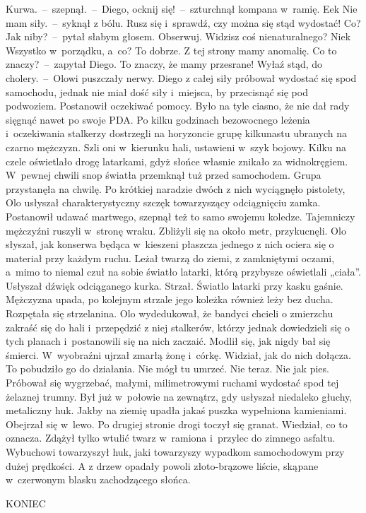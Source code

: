 \documentclass[../MAIN.tex]{subfiles}
\begin{document}
\sx Kurwa.~--~szepnął.~--~Diego, ocknij się!~--~szturchnął kompana w~ramię.
\xx Ee\3k Nie mam siły.~--~syknął z bólu.
\xx Rusz się i~sprawdź, czy można się stąd wydostać!
\xx Co? Jak niby?~--~pytał słabym głosem.
\xx Obserwuj. Widzisz coś nienaturalnego?
\xx Nie\3k Wszystko w~porządku, a~co?
\xx To dobrze. Z tej strony mamy anomalię.
\xx Co to znaczy?~--~zapytał Diego.
\xx To znaczy, że mamy przesrane! Wyłaź stąd, do cholery.~--~Olowi puszczały nerwy.
\qm
Diego z całej siły próbował wydostać się spod samochodu, jednak nie miał dość siły i~miejsca, by przecisnąć się pod podwoziem. Postanowił oczekiwać pomocy. Było na tyle ciasno, że nie dał rady sięgnąć nawet po swoje PDA.
\pp
Po kilku godzinach bezowocnego leżenia i~oczekiwania stalkerzy dostrzegli na horyzoncie grupę kilkunastu ubranych na czarno mężczyzn. Szli oni w~kierunku hali, ustawieni w~szyk bojowy. Kilku na czele oświetlało drogę latarkami, gdyż słońce własnie znikało za widnokręgiem. W~pewnej chwili snop światła przemknął tuż przed samochodem. Grupa przystanęła na chwilę. Po krótkiej naradzie dwóch z nich wyciągnęło pistolety, Olo usłyszał charakterystyczny szczęk towarzyszący odciągnięciu zamka. Postanowił udawać martwego, szepnął też to samo swojemu koledze.
\pp
Tajemniczy mężczyźni ruszyli w~stronę wraku. Zbliżyli się na około metr, przykucnęli. Olo słyszał, jak konserwa będąca w~kieszeni płaszcza jednego z nich ociera się o materiał przy każdym ruchu. Leżał twarzą do ziemi, z zamkniętymi oczami, a~mimo to niemal czuł na sobie światło latarki, którą przybysze oświetlali „ciała”.
\pp
Usłyszał dźwięk odciąganego kurka. Strzał. Światlo latarki przy kasku gaśnie. Mężczyzna upada, po kolejnym strzale jego koleżka również leży bez ducha. Rozpętała się strzelanina. Olo wydedukował, że bandyci chcieli o zmierzchu zakraść się do hali i~przepędzić z niej stalkerów, którzy jednak dowiedzieli się o tych planach i~postanowili się na nich zaczaić.
\pp
Modlił się, jak nigdy bał się śmierci. W~wyobraźni ujrzał zmarłą żonę i~córkę. Widział, jak do nich dołącza. To pobudziło go do działania. Nie mógł tu umrzeć. Nie teraz. Nie jak pies. Próbował się wygrzebać, małymi, milimetrowymi ruchami wydostać spod tej żelaznej trumny.
\pp
Był już w~połowie na zewnątrz, gdy usłyszał niedaleko głuchy, metaliczny huk. Jakby na ziemię upadła jakaś puszka wypełniona kamieniami. Obejrzał się w~lewo. Po drugiej stronie drogi toczył się granat. Wiedział, co to oznacza. Zdążył tylko wtulić twarz w~ramiona i~przylec do zimnego asfaltu.
\pp
Wybuchowi towarzyszył huk, jaki towarzyszy wypadkom samochodowym przy dużej prędkości. A z drzew opadały powoli złoto-brązowe liście, skąpane w~czerwonym blasku zachodzącego słońca.
\begin{center}
KONIEC
\end{center}
\end{document}
